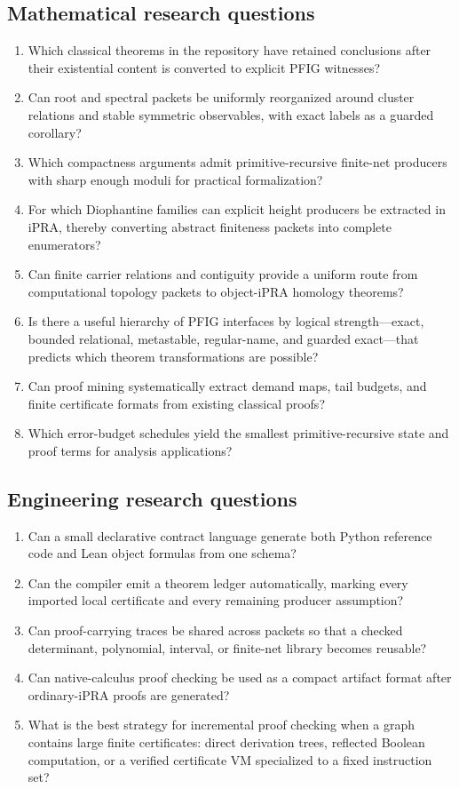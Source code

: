 \subsection{Mathematical research questions}

\begin{enumerate}
\item Which classical theorems in the repository have retained conclusions after their existential content is converted to explicit PFIG witnesses?
\item Can root and spectral packets be uniformly reorganized around cluster relations and stable symmetric observables, with exact labels as a guarded corollary?
\item Which compactness arguments admit primitive-recursive finite-net producers with sharp enough moduli for practical formalization?
\item For which Diophantine families can explicit height producers be extracted in iPRA, thereby converting abstract finiteness packets into complete enumerators?
\item Can finite carrier relations and contiguity provide a uniform route from computational topology packets to object-iPRA homology theorems?
\item Is there a useful hierarchy of PFIG interfaces by logical strength---exact, bounded relational, metastable, regular-name, and guarded exact---that predicts which theorem transformations are possible?
\item Can proof mining systematically extract demand maps, tail budgets, and finite certificate formats from existing classical proofs?
\item Which error-budget schedules yield the smallest primitive-recursive state and proof terms for analysis applications?
\end{enumerate}

\subsection{Engineering research questions}

\begin{enumerate}
\item Can a small declarative contract language generate both Python reference code and Lean object formulas from one schema?
\item Can the compiler emit a theorem ledger automatically, marking every imported local certificate and every remaining producer assumption?
\item Can proof-carrying traces be shared across packets so that a checked determinant, polynomial, interval, or finite-net library becomes reusable?
\item Can native-calculus proof checking be used as a compact artifact format after ordinary-iPRA proofs are generated?
\item What is the best strategy for incremental proof checking when a graph contains large finite certificates: direct derivation trees, reflected Boolean computation, or a verified certificate VM specialized to a fixed instruction set?
\end{enumerate}

